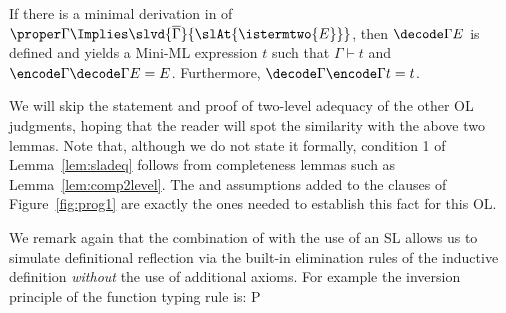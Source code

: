 \documentclass[final]{svjour3}
\begin{document}
\begin{lem}
If there is a minimal derivation in \HOL of
$\proper \Gamma \Implies
\slvd{\overline{\Gamma}}{\slAt{\istermtwo{E}}}$,
then $\decode\Gamma E$ is defined and yields a Mini-ML expression $t$
such that $\Gamma\vdash t$ and $\encode\Gamma{\decode \Gamma E} =
E$. Furthermore, $\decode\Gamma{\encode \Gamma t} = t$.
\label{lem:comp2level}
\end{lem}
We will skip the statement and proof of two-level adequacy of
the other OL judgments, hoping that the reader will spot the
similarity with the above two lemmas.
Note that, although we do not state it formally, condition 1 of
Lemma~\ref{lem:sladeq} follows from completeness lemmas such as
Lemma~\ref{lem:comp2level}.  The  and 
assumptions added to the clauses of Figure~\ref{fig:prog1} are exactly
the ones needed to establish this fact for this OL\@.


We remark again that the combination of \hybrid with the use of an
SL allows us to simulate definitional
reflection \cite{Halnass91} via the built-in elimination rules of the 
inductive definition \emph{without} the use of additional axioms.  For
example the inversion principle of the function typing rule is:
\beq {}
\Implies P
\eneq
\end{document}
